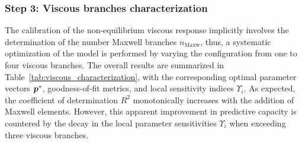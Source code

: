 \subsubsection{Step 3: Viscous branches characterization}

The calibration of the non-equilibrium viscous response implicitly involves the determination of the number Maxwell branches $n_\text{Maxw}$, thus, a systematic optimization of the model is performed by varying the configuration from one to four viscous branches. The overall results are summarized in Table~\ref{tab:viscous_characterization}, with the corresponding optimal parameter vectors $\boldsymbol{p}^*$, goodness-of-fit metrics, and local sensitivity indices $\Upsilon_i$. As expected, the coefficient of determination $R^2$ monotonically increases with the addition of Maxwell elements. However, this apparent improvement in predictive capacity is countered by the decay in the local parameter sensitivities $\Upsilon_i$ when exceeding three viscous branches.

